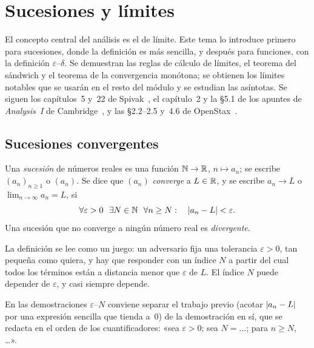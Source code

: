 \chapter{Sucesiones y límites}
\label{tema:2}

El concepto central del análisis es el de límite. Este tema lo introduce primero para sucesiones, donde la definición es más sencilla, y después para funciones, con la definición $\varepsilon$--$\delta$. Se demuestran las reglas de cálculo de límites, el teorema del sándwich y el teorema de la convergencia monótona; se obtienen los límites notables que se usarán en el resto del módulo y se estudian las asíntotas. Se siguen los capítulos~5 y~22 de Spivak~\cite{spivak}, el capítulo~2 y la §5.1 de los apuntes de \emph{Analysis~I} de Cambridge~\cite{cambA1}, y las §2.2--2.5 y~4.6 de OpenStax~\cite{osc1}.

\section{Sucesiones convergentes}

\begin{definicion}\label{def:limite-sucesion}
Una \emph{sucesión} de números reales es una función $\mathbb{N}\to\mathbb{R}$, $n\mapsto a_n$; se escribe $(a_n)_{n\ge1}$ o $(a_n)$. Se dice que $(a_n)$ \emph{converge} a $L\in\mathbb{R}$, y se escribe $a_n\to L$ o $\lim_{n\to\infty}a_n=L$, si
\[
\forall\varepsilon>0\ \ \exists N\in\mathbb{N}\ \ \forall n\ge N:\quad \lvert a_n-L\rvert<\varepsilon.
\]
Una sucesión que no converge a ningún número real es \emph{divergente}.
\end{definicion}

La definición se lee como un juego: un adversario fija una tolerancia $\varepsilon>0$, tan pequeña como quiera, y hay que responder con un índice $N$ a partir del cual todos los términos están a distancia menor que $\varepsilon$ de $L$. El índice $N$ puede depender de $\varepsilon$, y casi siempre depende.

\addtocounter{definicion}{1}%

\addtocounter{definicion}{1}%

En las demostraciones $\varepsilon$--$N$ conviene separar el trabajo previo (acotar $\lvert a_n-L\rvert$ por una expresión sencilla que tienda a~0) de la demostración en sí, que se redacta en el orden de los cuantificadores: «sea $\varepsilon>0$; sea $N=\dots$; para $n\ge N$, \dots».

